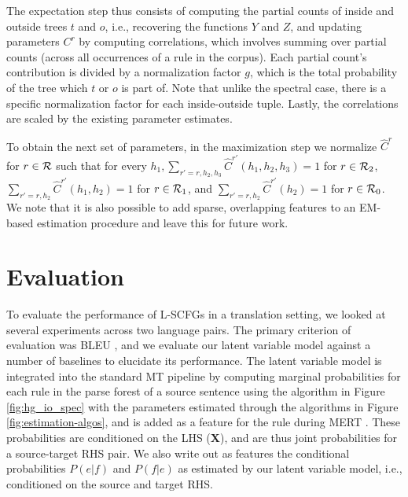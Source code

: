 \documentclass[11pt]{article}
\newcommand{\rules}{{\cal R}}
\newcommand{\e}[1]{\hat{#1}}
\newcommand{\bX}{{\bf X}}
\begin{document}
The expectation step thus consists of computing the partial counts of inside and outside trees $t$ and $o$, i.e., recovering the functions $Y$ and $Z$, and updating parameters $C^r$ by computing correlations, which involves summing over partial counts (across all occurrences of a rule in the corpus). 
Each partial count's contribution is divided by a normalization factor $g$, which is the total probability of the tree which $t$ or $o$ is part of.  
Note that unlike the spectral case, there is a specific normalization factor for each inside-outside tuple. 
Lastly, the correlations are scaled by the existing parameter estimates.

To obtain the next set of parameters, in the maximization step we normalize $\e{C}^r$ for $r \in \rules$ such that for every $h_1, \sum_{r'=r,h_2,h_3} \e{C}^{r'}(h_1, h_2, h_3) = 1$ for $r \in \rules_2$, $\sum_{r'=r,h_2} \e{C}^{r'}(h_1, h_2) = 1$ for $r \in \rules_1$, and $\sum_{r'=r,h_2} \e{C}^{r'}(h_2) = 1$ for $r \in \rules_0$.  
We note that it is also possible to add sparse, overlapping features to an EM-based estimation procedure \cite{Berg-Kirkpatrick2010} and leave this for future work.  

\section{Evaluation}
\label{sec:evaluation}
To evaluate the performance of L-SCFGs in a translation setting, we looked at several experiments across two language pairs.  
The primary criterion of evaluation was BLEU \cite{Papineni2002}, and we evaluate our latent variable model against a number of baselines to elucidate its performance.  
The latent variable model is integrated into the standard MT pipeline by computing marginal probabilities for each rule in the parse forest of a source sentence using the algorithm in Figure \ref{fig:hg_io_spec} with the parameters estimated through the algorithms in Figure \ref{fig:estimation-algos}, and is added as a feature for the rule during MERT \cite{Och2003}.  
These probabilities are conditioned on the LHS (\bX), and are thus joint probabilities for a source-target RHS pair.  
We also write out as features the conditional probabilities $P(e|f)$ and $P(f|e)$ as estimated by our latent variable model, i.e., conditioned on the source and target RHS.  
\end{document}
